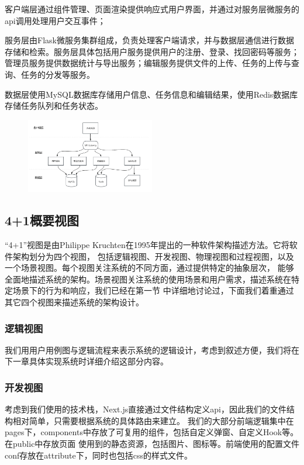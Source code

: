 客户端层通过组件管理、页面渲染提供响应式用户界面，并通过对服务层微服务的api调用处理用户交互事件；

服务层由Flask微服务集群组成，负责处理客户端请求，并与数据层通信进行数据存储和检索。服务层具体包括用户服务提供用户的注册、登录、找回密码等服务；
管理员服务提供数据统计与导出服务；编辑服务提供文件的上传、任务的上传与查询、任务的分发等服务。

数据层使用MySQL数据库存储用户信息、任务信息和编辑结果，使用Redis数据库存储任务队列和任务状态。

\begin{figure}[ht]
    \centering
    \includegraphics[width=0.5\textwidth]{source/img/system_structure.png}
    \label{fig:system-structure}
\end{figure}

\subsection{4+1概要视图}

“4+1”视图是由Philippe Kruchten在1995年提出的一种软件架构描述方法。它将软件架构划分为四个视图，
包括逻辑视图、开发视图、物理视图和过程视图，以及一个场景视图。每个视图关注系统的不同方面，通过提供特定的抽象层次，
能够全面地描述系统的架构。场景视图关注系统的使用场景和用户需求，描述系统在特定场景下的行为和响应，我们已经在第一节
中详细地讨论过，下面我们着重通过其它四个视图来描述系统的架构设计。

\subsubsection{逻辑视图}

我们用用户用例图与逻辑流程来表示系统的逻辑设计，考虑到叙述方便，我们将在下一章具体实现系统时详细介绍这部分内容。

\subsubsection{开发视图}

考虑到我们使用的技术栈，Next.js直接通过文件结构定义api，因此我们的文件结构相对简单，只需要根据系统的具体路由来建立。
我们的大部分前端逻辑集中在pages下，components中存放了可复用的组件，包括自定义弹窗、自定义Hook等。在public中存放页面
使用到的静态资源，包括图片、图标等。前端使用的配置文件conf存放在attribute下，同时也包括css的样式文件。

